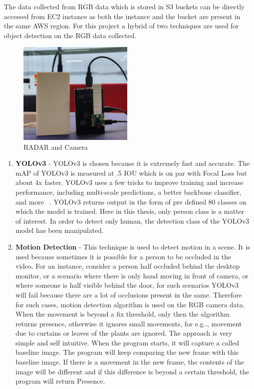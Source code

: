 The data collected from RGB data which is stored in S3 buckets can be directly accessed from EC2 instance as both the instance and the bucket are present in the same AWS region.  For this project a hybrid of  two techniques are used for object detection on the RGB data collected. 
\begin{figure}[ht]
  \begin{center}
    \includegraphics[width=0.5\textwidth]{Master's thesis/images/equipment.jpg} 
    \caption{RADAR and Camera}
    \label{fig:AoA}
  \end{center}
\end{figure}  
\begin{enumerate}
    \item \textbf{YOLOv3} - YOLOv3 is chosen because it is extremely fast and accurate. The mAP of YOLOv3 is measured at .5 IOU  which is on par with Focal Loss but about 4x faster. YOLOv3 uses a few tricks to improve training and increase performance, including multi-scale predictions, a better backbone classifier, and more ~\cite{yolo_time}. YOLOv3 returns output in the form of pre defined 80 classes on which the model is trained. Here in this thesis, only person class is a matter of interest. In order to detect only human, the detection class of the YOLOv3 model has been manipulated.
    \item \textbf{Motion Detection} - This technique is used to detect motion in a scene. It is used because sometimes it is possible for a person to be occluded in the video. For an instance, consider a person half occluded behind the desktop monitor, or a scenario where there is only hand moving in front of camera, or where someone is half visible behind the door, for such scenarios YOLOv3 will fail because there are a lot of occlusions present in the same. Therefore for such cases, motion detection algorithm is used on the RGB camera data. When the movement is beyond a fix threshold, only then the algorithm returns presence, otherwise it ignores small movements, for e.g.., movement due to curtains or leaves of the plants are ignored. The approach is very simple and self intuitive. When the program starts, it will capture a called baseline image. The program will keep comparing the new frame with this baseline image. If there is a movement in the new frame, the contents of the image will be different and if this difference is beyond a certain threshold,  the program will return Presence.
\end{enumerate}

